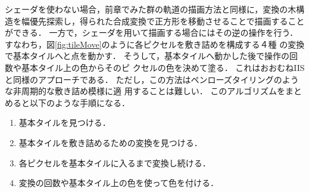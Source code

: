 シェーダを使わない場合，前章でみた群の軌道の描画方法と同様に，変換の木構
造を幅優先探索し，得られた合成変換で正方形を移動させることで描画すること
ができる．
一方で，シェーダを用いて描画する場合にはその逆の操作を行う．
すなわち，図\ref{fig:tileMove}のように各ピクセルを敷き詰めを構成する４種
の変換で基本タイルへと点を動かす．
そうして，基本タイルへ動かした後で操作の回数や基本タイル上の色からそのピ
クセルの色を決めて塗る．
これはおおむねIISと同様のアプローチである．
ただし，この方法はペンローズタイリングのような非周期的な敷き詰め模様に適
用することは難しい．
このアルゴリズムをまとめると以下のような手順になる．
\begin{enumerate}
 \item 基本タイルを見つける．
 \item 基本タイルを敷き詰めるための変換を見つける．
 \item 各ピクセルを基本タイルに入るまで変換し続ける．
 \item 変換の回数や基本タイル上の色を使って色を付ける．
\end{enumerate}

